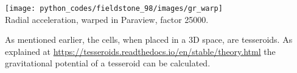 \begin{center}
\texttt{[image: python\_codes/fieldstone\_98/images/gr\_warp]}\\
{\captionfont Radial acceleration, warped in Paraview, factor 25000.}
\end{center}

As mentioned earlier, the cells, when placed in a 3D space, are tesseroids. 
As explained at \url{https://tesseroids.readthedocs.io/en/stable/theory.html}
the gravitational potential of a tesseroid can be calculated. 




